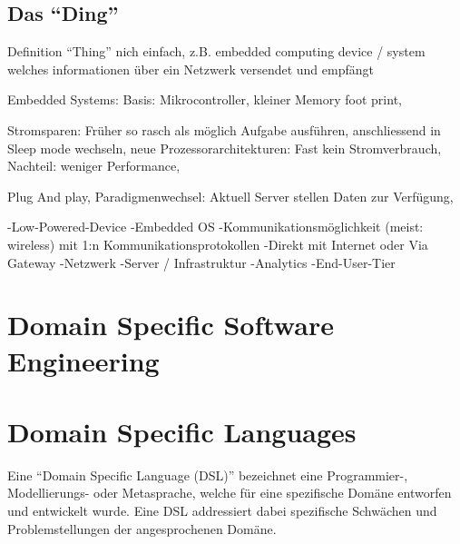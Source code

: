 \subsection{Das "`Ding"'}
Definition "`Thing"' nich einfach, z.B. embedded computing device / system welches informationen über ein Netzwerk versendet und empfängt

Embedded Systems: Basis: Mikrocontroller, kleiner Memory foot print, 


Stromsparen: Früher so rasch als möglich Aufgabe ausführen, anschliessend in Sleep mode wechseln, neue Prozessorarchitekturen: Fast kein Stromverbrauch, Nachteil: weniger Performance, 

Plug And play, Paradigmenwechsel: Aktuell Server stellen Daten zur Verfügung, 

-Low-Powered-Device
-Embedded OS
-Kommunikationsmöglichkeit (meist: wireless) mit 1:n Kommunikationsprotokollen
-Direkt mit Internet oder Via Gateway
-Netzwerk
-Server / Infrastruktur
-Analytics
-End-User-Tier
\section{Domain Specific Software Engineering}


\section{Domain Specific Languages}
Eine "`Domain Specific Language (DSL)"' bezeichnet eine Programmier-, Modellierungs- oder Metasprache, welche für eine spezifische Domäne entworfen und entwickelt wurde. Eine DSL addressiert dabei spezifische Schwächen und Problemstellungen der angesprochenen Domäne.



